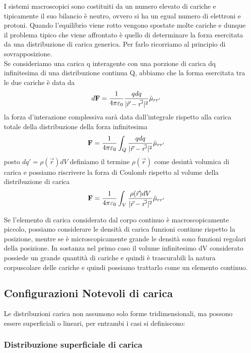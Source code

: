 I sistemi macroscopici sono costituiti da un numero elevato di cariche e tipicamente il suo bilancio \`e neutro, ovvero si ha un egual numero di elettroni e protoni. Quando l'equilibrio viene rotto vengono spostate molte cariche e dunque il problema tipico che viene affrontato \`e quello di determinare la forza esercitata da una distribuzione di carica generica. Per farlo ricorriamo al principio di sovrapposizione. 
\\

\noindent Se consideriamo una carica q interagente con una porzione di carica dq infinitesima di una distribuzione continua Q, abbiamo che la forma esercitata tra le due cariche \`e data da
\begin{equation*}
	d\bold{F} = \frac{1}{4 \pi \varepsilon_0} \frac{qdq}{|\vec{r} -\vec{r'}|^2}\hat{\mu}_{rr'}
\end{equation*}
la forza d'interazione complessiva sar\`a data dall'integrale rispetto alla carica totale della distribuzione della forza infinitesima 
\begin{equation*}
	\bold{F} = \frac{1}{4 \pi \varepsilon_0} \int_{Q} \frac{qdq}{|\vec{r} -\vec{r'}|^2}\hat{\mu}_{rr'}
\end{equation*}
posto $dq' = \rho(\vec{r})dV$ definiamo il termine $\rho(\vec{r})$ come desint\`a volumica di carica e possiamo riscrivere la forza di Coulomb rispetto al volume della distribuzione di carica
\begin{equation*}
	\bold{F} = \frac{1}{4 \pi \varepsilon_0} \int_{V} \frac{\rho(\vec{r})dV}{|\vec{r} -\vec{r'}|^2}\hat{\mu}_{rr'}
\end{equation*}

Se l'elemento di carica considerato dal corpo continuo \`e macroscopicamente piccolo, possiamo considerare le densit\`a di carica funzioni continue rispetto la posizione, mentre se \`e microscopicamente grande le densit\`a sono funzioni regolari della posizione. In sostanza nel primo caso il volume infinitesimo dV considerato possiede un grande quantit\`a di cariche e quindi \`e trascurabili la natura corpuscolare delle cariche e quindi possiamo trattarlo come un elemento continuo.

\subsection{Configurazioni Notevoli di carica}
Le distribuzioni carica non assumono solo forme tridimensionali, ma possono essere superficiali o lineari, per entrambi i casi si definiscono:
\subsubsection{Distribuzione superficiale di carica}


